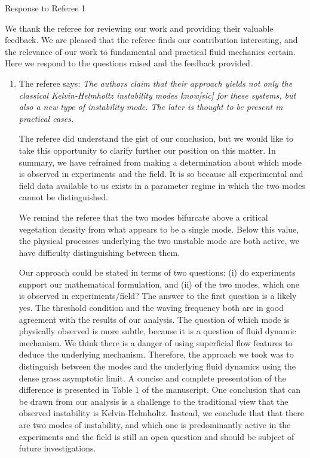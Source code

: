 \documentclass[letterpaper,10pt]{article}
\begin{document}
\centerline{Response to Referee 1}
We thank the referee for reviewing our work and providing their valuable feedback. 
We are pleased that the referee finds our contribution interesting, and the relevance of our work to fundamental and practical fluid mechanics certain.
Here we respond to the questions raised and the feedback provided.

\begin{enumerate}
\item The referee says:
\textit{
The authors claim that their approach yields not only the classical Kelvin-Helmholtz instability modes know[sic] for these systems, but also a new type of instability mode. The later is thought to be present in practical cases.
}

The referee did understand the gist of our conclusion, but we would like to take this opportunity to clarify further our position on this matter. In summary, we have refrained from making a determination about which mode is observed in experiments and the field. It is so because all experimental and field data available to us exists in a parameter regime in which the two modes cannot be distinguished. 

We remind the referee that the two modes bifurcate above a critical vegetation density from what appears to be a single mode. Below this value, the physical processes underlying the two unstable mode are both active, we have difficulty distinguishing between them. 

Our approach could be stated in terms of two questions: (i) do experiments support our mathematical formulation, and (ii) of the two modes, which one is observed in experiments/field? The answer to the first question is a likely yes. The threshold condition and the waving frequency both are in good agreement with the results of our analysis. The question of which mode is physically observed is more subtle, because it is a question of fluid dynamic mechanism. We think there is a danger of using superficial flow features to deduce the underlying mechanism. Therefore, the approach we took was to distinguish between the modes and the underlying fluid dynamics using the dense grass asymptotic limit. A concise and complete presentation of the difference is presented in Table 1 of the manuscript. One conclusion that can be drawn from our analysis is a challenge to the traditional view that the observed instability is Kelvin-Helmholtz. Instead, we conclude that that there are two modes of instability, and which one is predominantly active in the experiments and the field is still an open question and should be subject of future investigations. 


\end{enumerate}
\end{document}
